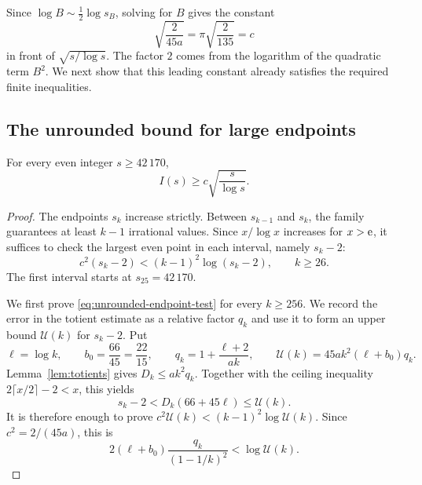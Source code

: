 Since $\log B\sim\tfrac12\log s_B$, solving for $B$
gives the constant
\[
 \sqrt{\frac{2}{45a}}=\pi\sqrt{\frac2{135}}=c
\]
in front of $\sqrt{s/\log s}$. The factor $2$ comes from the
logarithm of the quadratic term $B^2$. We next show that this
leading constant already satisfies the required finite inequalities.

\subsection{The unrounded bound for large endpoints}

\begin{proposition}\label{prop:unrounded}
For every even integer $s\ge42\,170$,
\[
 I(s)\ge c\sqrt{\frac{s}{\log s}}.
\]
\end{proposition}
\begin{proof}
The endpoints $s_k$ increase strictly. Between $s_{k-1}$ and
$s_k$, the family guarantees at least $k-1$ irrational values.
Since $x/\log x$ increases for $x>\mathrm e$, it suffices to check
the largest even point in each interval, namely $s_k-2$:
\begin{equation}\label{eq:unrounded-endpoint-test}
 c^2(s_k-2)<(k-1)^2\log(s_k-2),\qquad k\ge26.
\end{equation}
The first interval starts at $s_{25}=42\,170$.

We first prove \eqref{eq:unrounded-endpoint-test} for every
$k\ge256$. We record the error in the totient estimate as a
relative factor $q_k$ and use it to form an upper bound
$\mathcal U(k)$ for $s_k-2$. Put
\[
 \ell=\log k,\qquad b_0=\frac{66}{45}=\frac{22}{15},\qquad
 q_k=1+\frac{\ell+2}{ak},\qquad
 \mathcal U(k)=45ak^2(\ell+b_0)q_k.
\]
Lemma~\ref{lem:totients} gives $D_k\le ak^2q_k$. Together with
the ceiling inequality $2\lceil x/2\rceil-2<x$, this yields
\begin{equation}\label{eq:endpoint-upper}
 s_k-2<D_k(66+45\ell)\le\mathcal U(k).
\end{equation}
It is therefore enough to prove
$c^2\mathcal U(k)<(k-1)^2\log\mathcal U(k)$. Since
$c^2=2/(45a)$, this is
\begin{equation}\label{eq:upper-comparison}
 2(\ell+b_0)\frac{q_k}{(1-1/k)^2}<\log\mathcal U(k).
\end{equation}


\end{proof}
